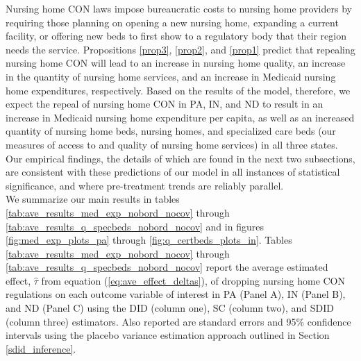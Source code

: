 \documentclass[../Main.tex]{subfiles}
\begin{document}
Nursing home CON laws impose bureaucratic costs to nursing home providers by requiring those planning on opening a new nursing home, expanding a current facility, or offering new beds to first show to a regulatory body that their region needs the service. Propositions \ref{prop3}, \ref{prop2}, and \ref{prop1} predict that repealing nursing home CON will lead to an increase in nursing home quality, an increase in the quantity of nursing home services, and an increase in Medicaid nursing home expenditures, respectively. Based on the results of the model, therefore, we expect the repeal of nursing home CON in PA, IN, and ND to result in an increase in Medicaid nursing home expenditure per capita, as well as an increased quantity of nursing home beds, nursing homes, and specialized care beds (our measures of access to and quality of nursing home services) in all three states. Our empirical findings, the details of which are found in the next two subsections, are consistent with these predictions of our model in all instances of statistical significance, and where pre-treatment trends are reliably parallel.\\
\indent We summarize our main results in tables \ref{tab:ave_results_med_exp_nobord_nocov} through \ref{tab:ave_results_q_specbeds_nobord_nocov} and in figures \ref{fig:med_exp_plots_pa} through \ref{fig:q_certbeds_plots_in}. Tables \ref{tab:ave_results_med_exp_nobord_nocov} through \ref{tab:ave_results_q_specbeds_nobord_nocov} report the average estimated effect, $\hat{\tau}$ from equation (\ref{eq:ave_effect_deltas}), of dropping nursing home CON regulations on each outcome variable of interest in PA (Panel A), IN (Panel B), and ND (Panel C) using the DID (column one), SC (column two), and SDID (column three) estimators. Also reported are standard errors and 95\% confidence intervals using the placebo variance estimation approach outlined in Section \ref{sdid_inference}.\\
\end{document}
